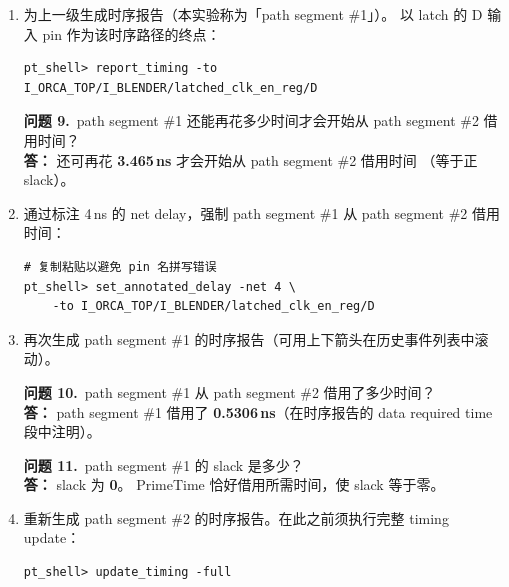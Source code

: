 \begin{enumerate}
\begin{questionBox}
生成 path segment \#2 的命令：
\begin{lstlisting}
pt_shell> report_timing -from \
    I_ORCA_TOP/I_BLENDER/latched_clk_en_reg/EN
\end{lstlisting}
\end{questionBox}

  \item 为上一级生成时序报告（本实验称为「path segment \#1」）。
        以 latch 的 D 输入 pin 作为该时序路径的终点：
\begin{lstlisting}
pt_shell> report_timing -to I_ORCA_TOP/I_BLENDER/latched_clk_en_reg/D
\end{lstlisting}

\begin{questionBox}
\textbf{问题 9.}\ path segment \#1 还能再花多少时间才会开始从 path segment \#2 借用时间？\\[0.35em]
\textbf{答：} 还可再花 \textbf{3.465\,ns} 才会开始从 path segment \#2 借用时间
（等于正 slack）。
\end{questionBox}

  \item 通过标注 4\,ns 的 net delay，强制 path segment \#1 从 path segment \#2 借用时间：
\begin{lstlisting}
# 复制粘贴以避免 pin 名拼写错误
pt_shell> set_annotated_delay -net 4 \
    -to I_ORCA_TOP/I_BLENDER/latched_clk_en_reg/D
\end{lstlisting}

  \item 再次生成 path segment \#1 的时序报告（可用上下箭头在历史事件列表中滚动）。

\begin{questionBox}
\textbf{问题 10.}\ path segment \#1 从 path segment \#2 借用了多少时间？\\[0.35em]
\textbf{答：} path segment \#1 借用了 \textbf{0.5306\,ns}（在时序报告的 data required time 段中注明）。

\textbf{问题 11.}\ path segment \#1 的 slack 是多少？\\[0.35em]
\textbf{答：} slack 为 \textbf{0}。
PrimeTime 恰好借用所需时间，使 slack 等于零。
\end{questionBox}

  \item 重新生成 path segment \#2 的时序报告。在此之前须执行完整 timing update：
\begin{lstlisting}
pt_shell> update_timing -full
\end{lstlisting}


\end{enumerate}
